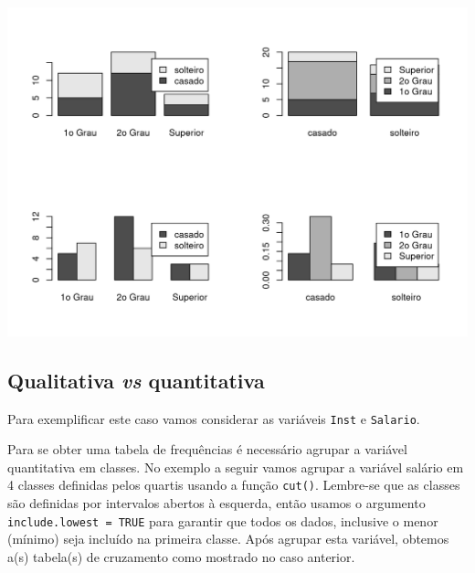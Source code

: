 \documentclass[
  10pt,
  a4paper]{book}
\begin{document}
\begin{center}\includegraphics{figures/unnamed-chunk-317-1} \end{center}

\hypertarget{qualitativa-vs-quantitativa}{%
\subsection{\texorpdfstring{Qualitativa \emph{vs} quantitativa}{Qualitativa vs quantitativa}}\label{qualitativa-vs-quantitativa}}

Para exemplificar este caso vamos considerar as variáveis \texttt{Inst} e
\texttt{Salario}.

Para se obter uma tabela de frequências é necessário agrupar a variável
quantitativa em classes. No exemplo a seguir vamos agrupar a variável
salário em 4 classes definidas pelos quartis usando a função \texttt{cut()}.
Lembre-se que as classes são definidas por intervalos abertos à esquerda,
então usamos o argumento \texttt{include.lowest\ =\ TRUE} para garantir que todos
os dados, inclusive o menor (mínimo) seja incluído na primeira classe.
Após agrupar esta variável, obtemos a(s) tabela(s) de cruzamento como
mostrado no caso anterior.
\end{document}
